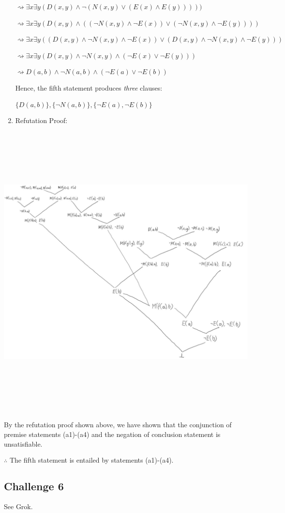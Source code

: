\documentclass[12pt]{article}
\begin{document}
\begin{enumerate}
$\rightsquigarrow \exists x \exists y(D(x,y) \land \neg (N(x,y) \lor (E(x) \land E(y)))))$

$\rightsquigarrow \exists x \exists y(D(x,y) \land ((\neg N(x,y) \land \neg E(x)) \lor (\neg N(x,y) \land \neg E(y))))$

$\rightsquigarrow \exists x \exists y((D(x,y) \land \neg N(x,y) \land \neg E(x)) \lor (D(x,y) \land \neg N(x,y) \land \neg E(y)))$

$\rightsquigarrow \exists x \exists y(D(x,y) \land \neg N(x,y) \land (\neg E(x) \lor \neg E(y)))$

$\rightsquigarrow D(a,b) \land \neg N(a,b) \land (\neg E(a) \lor \neg E(b))$

\bigskip
Hence, the fifth statement produces \emph{three} clauses:

$\{D(a,b)\}, \{\neg N(a,b)\}, \{\neg E(a), \neg E(b)\}$

\bigskip
\item Refutation Proof:
\end{enumerate}

\begin{center}
\includegraphics[width=7in,height=6in,keepaspectratio]{q5_refutation.jpg}
\end{center}

\bigskip
\noindent
By the refutation proof shown above, we have shown that the conjunction of
premise statements (a1)-(a4) and the negation of conclusion statement is
unsatisfiable.
\bigskip
\noindent

$\therefore$ The fifth statement is entailed by statements (a1)-(a4).

\subsection*{Challenge 6}
See Grok.
\end{document}
